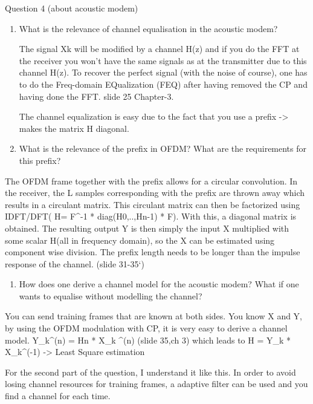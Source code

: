 \documentclass[
  a4paper,
  ,captions=tableheading
]{scrartcl}
\providecommand{\tightlist}{%
  \setlength{\itemsep}{0pt}\setlength{\parskip}{0pt}}
\begin{document}
Question 4 (about acoustic modem)

\begin{enumerate}
\def\labelenumi{\arabic{enumi}.}
\item
  What is the relevance of channel equalisation in the acoustic modem?

  The signal Xk will be modified by a channel H(z) and if you do the FFT
  at the receiver you won't have the same signals as at the transmitter
  due to this channel H(z). To recover the perfect signal (with the
  noise of course), one has to do the Freq-domain EQualization (FEQ)
  after having removed the CP and having done the FFT. slide 25
  Chapter-3.

  The channel equalization is easy due to the fact that you use a prefix
  -\textgreater{} makes the matrix H diagonal.
\item
  What is the relevance of the prefix in OFDM? What are the requirements
  for this prefix?
\end{enumerate}

The OFDM frame together with the prefix allows for a circular
convolution. In the receiver, the L samples corresponding with the
prefix are thrown away which results in a circulant matrix. This
circulant matrix can then be factorized using IDFT/DFT( H= F\^{}-1 *
diag(H0,..,Hn-1) * F). With this, a diagonal matrix is obtained. The
resulting output Y is then simply the input X multiplied with some
scalar H(all in frequency domain), so the X can be estimated using
component wise division. The prefix length needs to be longer than the
impulse response of the channel. (slide 31-35`)

\begin{enumerate}
\def\labelenumi{\arabic{enumi}.}
\setcounter{enumi}{2}
\tightlist
\item
  How does one derive a channel model for the acoustic modem? What if
  one wants to equalise without modelling the channel?
\end{enumerate}

You can send training frames that are known at both sides. You know X
and Y, by using the OFDM modulation with CP, it is very easy to derive a
channel model. Y\_k\^{}(n) = Hn * X\_k \^{}(n) (slide 35,ch 3) which
leads to H = Y\_k * X\_k\^{}(-1) -\textgreater{} Least Square estimation

For the second part of the question, I understand it like this. In order
to avoid losing channel resources for training frames, a adaptive filter
can be used and you find a channel for each time.
\end{document}
